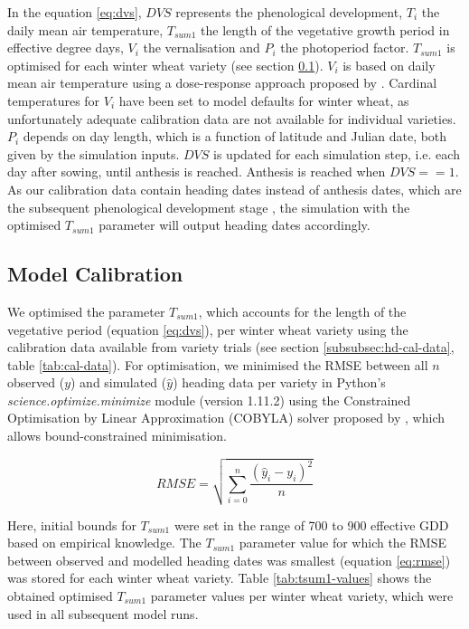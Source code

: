 In the equation \ref{eq:dvs}, $DVS$ represents the phenological development, $T_i$ the daily mean air temperature, $T_{sum1}$ the length of the vegetative growth period in effective degree days, $V_i$ the vernalisation and $P_i$ the photoperiod factor. $T_{sum1}$ is optimised for each winter wheat variety (see section \ref{subsec:hd-model-cal}). $V_i$ is based on daily mean air temperature using a dose-response approach proposed by \cite{wang_simulation_1998}. Cardinal temperatures for $V_i$ have been set to model defaults for winter wheat, as unfortunately adequate calibration data are not available for individual varieties. $P_i$ depends on day length, which is a function of latitude and Julian date, both given by the simulation inputs. $DVS$ is updated for each simulation step, i.e. each day after sowing, until anthesis is reached. Anthesis is reached when $DVS == 1$. As our calibration data contain heading dates instead of anthesis dates, which are the subsequent phenological development stage \citep{meier_growth_2018}, the simulation with the optimised $T_{sum1}$ parameter will output heading dates accordingly.

\subsection{Model Calibration}
\label{subsec:hd-model-cal}
We optimised the parameter $T_{sum1}$, which accounts for the length of the vegetative period (equation \ref{eq:dvs}), per winter wheat variety using the calibration data available from variety trials (see section \ref{subsubsec:hd-cal-data}, table \ref{tab:cal-data}). For optimisation, we minimised the \gls{RMSE} between all $n$ observed ($y$) and simulated ($\hat{y}$) heading data per variety in Python's \textsl{science.optimize.minimize} module (version 1.11.2) using the Constrained Optimisation by Linear Approximation (COBYLA) solver proposed by \cite{powell_efficient_1964}, which allows bound-constrained minimisation.

\begin{equation}
\label{eq:rmse}
    RMSE = \sqrt{\sum_{i=0}^n \frac{(\hat{y}_i - y_i)^2}{n}}
\end{equation}

Here, initial bounds for $T_{sum1}$ were set in the range of 700 to 900 effective \gls{GDD} based on empirical knowledge. The $T_{sum1}$ parameter value for which the RMSE between observed and modelled heading dates was smallest (equation \ref{eq:rmse}) was stored for each winter wheat variety. Table \ref{tab:tsum1-values} shows the obtained optimised $T_{sum1}$ parameter values per winter wheat variety, which were used in all subsequent model runs.

